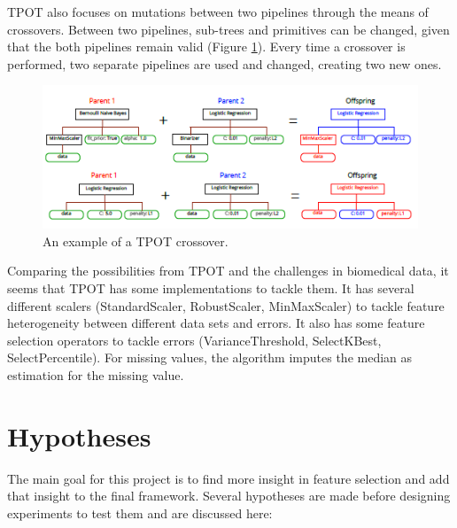 	TPOT also focuses on mutations between two pipelines through the means of crossovers. Between two pipelines, sub-trees and primitives can be changed, given that the both pipelines remain valid (Figure \ref{fig:TPOTCrossover}). Every time a crossover is performed, two separate pipelines are used and changed, creating two new ones.
	
	\begin{figure}[h!]
		\includegraphics[scale=1]{TPOTCrossover.png}
		\caption{An example of a TPOT crossover\cite{Gijsbers2017Thesis}.}
		\label{fig:TPOTCrossover}
	\end{figure}
	
	Comparing the possibilities from TPOT and the challenges in biomedical data, it seems that TPOT has some implementations to tackle them. It has several different scalers (StandardScaler, RobustScaler, MinMaxScaler) to tackle feature heterogeneity between different data sets and errors. It also has some feature selection operators to tackle errors (VarianceThreshold, SelectKBest, SelectPercentile). For missing values, the algorithm imputes the median as estimation for the missing value.
	
	\newpage
	\section{Hypotheses}
	\label{sec:hypotheses}
	
	The main goal for this project is to find more insight in feature selection and add that insight to the final framework. Several hypotheses are made before designing experiments to test them and are discussed here:
	
